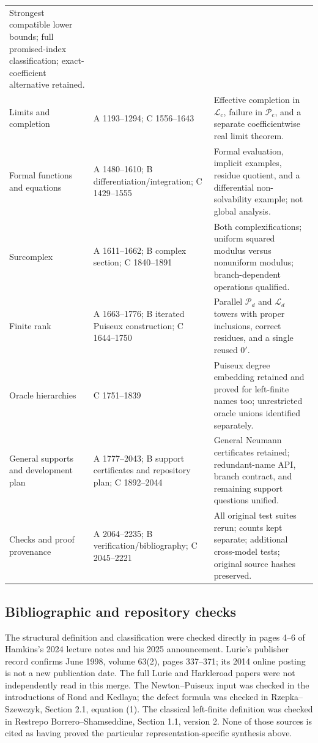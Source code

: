\documentclass[11pt,letterpaper]{article}
\numberwithin{equation}{section}
\theoremstyle{definition}
\theoremstyle{remark}
\newcommand{\Lc}{\mathcal L_{\mathrm c}}
\newcommand{\Pc}{\mathcal P_{\mathrm c}}
\begin{document}
\begin{longtable}{@{}p{}p{}p{}@{}}
Strongest compatible lower bounds; full promised-index classification; exact-coefficient alternative retained.\\
Limits and completion & A 1193--1294; C 1556--1643 &
Effective completion in $\Lc$, failure in $\Pc$, and a separate coefficientwise real limit theorem.\\
Formal functions and equations & A 1480--1610; B differentiation/integration; C 1429--1555 &
Formal evaluation, implicit examples, residue quotient, and a differential non-solvability example; not global analysis.\\
Surcomplex & A 1611--1662; B complex section; C 1840--1891 &
Both complexifications; uniform squared modulus versus nonuniform modulus; branch-dependent operations qualified.\\
Finite rank & A 1663--1776; B iterated Puiseux construction; C 1644--1750 &
Parallel $\mathcal P_d$ and $\mathcal L_d$ towers with proper inclusions, correct residues, and a single reused $0'$.\\
Oracle hierarchies & C 1751--1839 &
Puiseux degree embedding retained and proved for left-finite names too; unrestricted oracle unions identified separately.\\
General supports and development plan & A 1777--2043; B support certificates and repository plan; C 1892--2044 &
General Neumann certificates retained; redundant-name API, branch contract, and remaining support questions unified.\\
Checks and proof provenance & A 2064--2235; B verification/bibliography; C 2045--2221 &
All original test suites rerun; counts kept separate; additional cross-model tests; original source hashes preserved.\\
\bottomrule
\end{longtable}
\normalsize

\subsection{Bibliographic and repository checks}
The structural definition and classification were checked directly in pages
4--6 of Hamkins's 2024 lecture notes and his 2025 announcement. Lurie's
publisher record confirms June 1998, volume 63(2), pages 337--371; its 2014
online posting is not a new publication date. The full Lurie and Harkleroad
papers were not independently read in this merge. The Newton--Puiseux input
was checked in the introductions of Rond and Kedlaya; the defect formula
was checked in Rzepka--Szewczyk, Section 2.1, equation (1). The classical
left-finite definition was checked in Restrepo Borrero--Shamseddine,
Section 1.1, version 2. None of those sources is cited as having proved the
particular representation-specific synthesis above.
\end{document}
